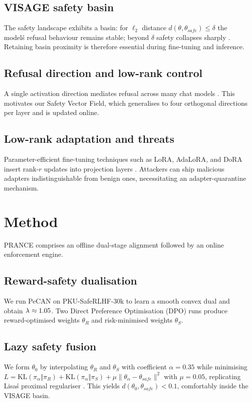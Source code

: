 \documentclass{article}
\begin{document}
\subsection{VISAGE safety basin}
The safety landscape exhibits a basin: for $\ell_{2}$ distance $d(\theta,\theta_{safe})\leq \delta$ the model\'s refusal behaviour remains stable; beyond $\delta$ safety collapses sharply \cite{peng-2024-navigating}. Retaining basin proximity is therefore essential during fine-tuning and inference.
\subsection{Refusal direction and low-rank control}
A single activation direction mediates refusal across many chat models \cite{arditi-2024-refusal}. This motivates our Safety Vector Field, which generalises to four orthogonal directions per layer and is updated online.
\subsection{Low-rank adaptation and threats}
Parameter-efficient fine-tuning techniques such as LoRA, AdaLoRA, and DoRA insert rank-$r$ updates into projection layers \cite{liu-2024-dora,zhang-2023-adaptive}. Attackers can ship malicious adapters indistinguishable from benign ones, necessitating an adapter-quarantine mechanism.

\section{Method}
PRANCE comprises an offline dual-stage alignment followed by an online enforcement engine.
\subsection{Reward-safety dualisation}
We run PeCAN on PKU-SafeRLHF-30k to learn a smooth convex dual and obtain $\lambda^{\*} \approx 1.05$. Two Direct Preference Optimisation (DPO) runs produce reward-optimised weights $\theta_{R}$ and risk-minimised weights $\theta_{S}$.
\subsection{Lazy safety fusion}
We form $\theta_{0}$ by interpolating $\theta_{R}$ and $\theta_{S}$ with coefficient $\alpha = 0.35$ while minimising $L = \mathrm{KL}(\pi_{\alpha}\Vert\pi_{R}) + \mathrm{KL}(\pi_{\alpha}\Vert\pi_{S}) + \mu\lVert\theta_{\alpha} - \theta_{safe}\rVert^{2}$ with $\mu = 0.05$, replicating Lisa\'s proximal regulariser \cite{huang-2024-lisa}. This yields $d(\theta_{0},\theta_{safe})<0.1$, comfortably inside the VISAGE basin.
\end{document}
